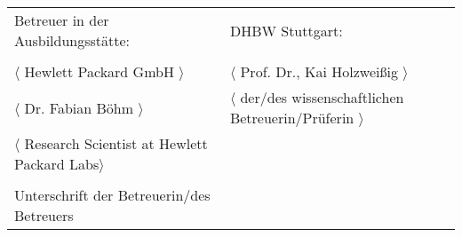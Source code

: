 \begin{spacing}{1}
\vfill

\begin{tabular}{ll}
Betreuer in der Ausbildungsstätte: & DHBW Stuttgart: \\
\hspace{0.4\linewidth} & \\
$\langle$ Hewlett Packard GmbH $\rangle$ & $\langle$ Prof. Dr., Kai Holzweißig $\rangle$ \\
$\langle$ Dr. Fabian Böhm $\rangle$ 
& $\langle$ der/des wissenschaftlichen Betreuerin/Prüferin $\rangle$ \\
$\langle$ Research Scientist at Hewlett Packard Labs$\rangle$ \\
\\
Unterschrift der Betreuerin/des Betreuers \\
\end{tabular}


\vspace{1cm}
\end{spacing}

 


